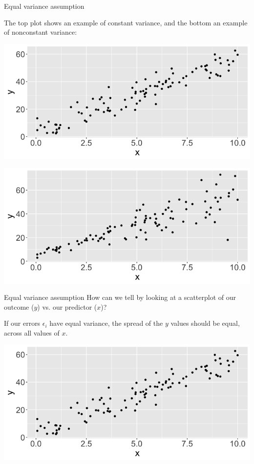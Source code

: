 \documentclass[10pt,t]{beamer}
\begin{document}
\begin{frame}{Equal variance assumption}

The top plot shows an example of constant variance, and the bottom an example of nonconstant variance:

\vspace{0.3cm}

\centering

\includegraphics[scale=0.2]{figures/constvar.png}

\includegraphics[scale=0.2]{figures/nonconstvar.png}

\end{frame}

\begin{frame}{Equal variance assumption}
How can we tell by looking at a scatterplot of our outcome ($y$) vs. our predictor ($x$)?

\vspace{0.3cm}

If our errors $\epsilon_i$ have equal variance, the spread of the $y$ values should be equal, across all values of $x$.

\vspace{0.3cm}
\centering

\includegraphics[scale=0.3]{figures/constvar.png}

\end{frame}
\end{document}
